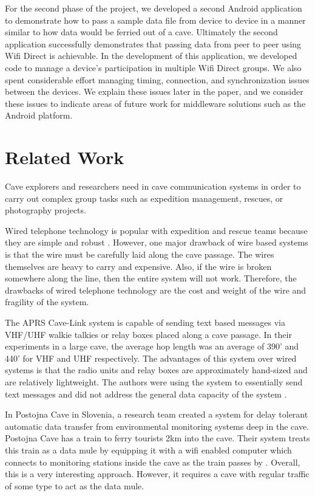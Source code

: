 \documentclass[10pt,twocolumn]{article}
\begin{document}
For the second phase of the project, we developed a second Android application to demonstrate how to pass a sample data file from device to device in a manner similar to how data would be ferried out of a cave.
Ultimately the second application successfully demonstrates that passing data from peer to peer using Wifi Direct is achievable. 
In the development of this application, we developed code to manage a device's participation in multiple Wifi Direct groups.
We also spent considerable effort managing timing, connection, and synchronization issues between the devices.
We explain these issues later in the paper, and we consider these issues to indicate areas of future work for middleware solutions
such as the Android platform.



\section{Related Work}
Cave explorers and researchers need in cave communication systems in order to carry out complex group tasks such as expedition management, rescues, or photography projects.

Wired telephone technology is popular with expedition and rescue teams because they are simple and robust \cite{cavecomm}.
However, one major drawback of wire based systems is that the wire must be carefully laid along the cave passage. 
The wires themselves are heavy to carry and expensive.
Also, if the wire is broken somewhere along the line, then the entire system will not work.
Therefore, the drawbacks of wired telephone technology are the cost and weight of the wire and fragility of the system.

The APRS Cave-Link system is capable of sending text based messages via VHF/UHF walkie talkies or relay boxes placed along a cave passage.
In their experiments in a large cave, the average hop length was an average of 390' and 440' for VHF and UHF respectively.
The advantages of this system over wired systems is that the radio units and relay boxes are approximately hand-sized and are relatively lightweight.
The authors were using the system to essentially send text messages and did not address the general data capacity of the system \cite{cavelink}.

In Postojna Cave in Slovenia, a research team created a system for delay tolerant automatic data transfer from environmental monitoring systems deep in the cave.
Postojna Cave has a train to ferry tourists 2km into the cave.
Their system treats this train as a data mule by equipping it with a wifi enabled computer which connects to monitoring stations inside the cave as the train passes by \cite{postojna2014}.
Overall, this is a very interesting approach. 
However, it requires a cave with regular traffic of some type to act as the data mule.
\end{document}
